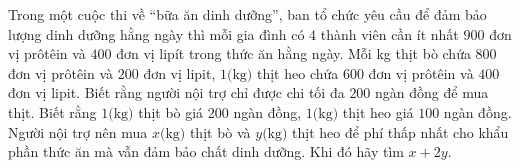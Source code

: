 \begin{ex}%
Trong một cuộc thi về “bữa ăn dinh dưỡng”, ban tổ chức yêu cầu để đảm bảo lượng dinh dưỡng hằng ngày thì mỗi gia đình có $4$ thành viên cần ít nhất $900$ đơn vị prôtêin và $400$ đơn vị lipít trong thức ăn hằng ngày. Mỗi kg thịt bò chứa $800$ đơn vị prôtêin và $200$ đơn vị lipit, $1\text{(kg)}$ thịt heo chứa $600$ đơn vị prôtêin và $400$ đơn vị lipit. Biết rằng người nội trợ chỉ được chi tối đa $200$ ngàn đồng để mua thịt. Biết rằng $1\text{(kg)}$ thịt bò giá $200$ ngàn đồng, $1\text{(kg)}$ thịt heo giá $100$ ngàn đồng. Người nội trợ nên mua $x\text{(kg)}$ thịt bò và $y\text{(kg)}$ thịt heo để phí thấp nhất cho khẩu phần thức ăn mà vẫn đảm bảo chất dinh dưỡng. Khi đó hãy tìm $x+2y.$
\end{ex}
%
